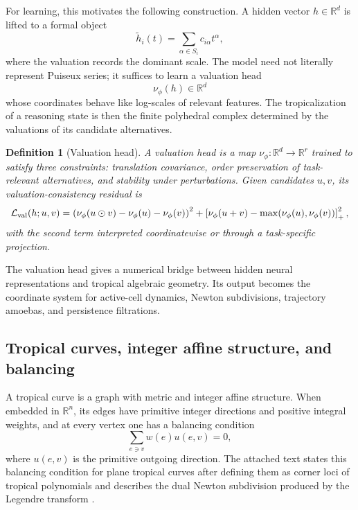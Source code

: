 \documentclass[11pt]{article}
\newtheorem{definition}{Definition}[section]
\newcommand{\R}{\mathbb{R}}
\newcommand{\calL}{\mathcal{L}}
\begin{document}
For learning, this motivates the following construction.  A hidden vector \(h\in\R^d\) is lifted to a formal object
\begin{equation}
\tilde h_i(t)=\sum_{\alpha\in S_i} c_{i\alpha}t^\alpha,
\end{equation}
where the valuation records the dominant scale.  The model need not literally represent Puiseux series; it suffices to learn a valuation head
\begin{equation}
\nu_\phi(h)\in\R^d
\end{equation}
whose coordinates behave like log-scales of relevant features.  The tropicalization of a reasoning state is then the finite polyhedral complex determined by the valuations of its candidate alternatives.

\begin{definition}[Valuation head]
A valuation head is a map \(\nu_\phi:\R^d\to\R^r\) trained to satisfy three constraints: translation covariance, order preservation of task-relevant alternatives, and stability under perturbations.  Given candidates \(u,v\), its valuation-consistency residual is
\begin{equation}
\calL_{\rm val}(h;u,v)=\left(\nu_\phi(u\odot v)-\nu_\phi(u)-\nu_\phi(v)\right)^2 + \left[\nu_\phi(u+v)-\max(\nu_\phi(u),\nu_\phi(v))\right]_+^2,
\end{equation}
with the second term interpreted coordinatewise or through a task-specific projection.
\end{definition}

The valuation head gives a numerical bridge between hidden neural representations and tropical algebraic geometry.  Its output becomes the coordinate system for active-cell dynamics, Newton subdivisions, trajectory amoebas, and persistence filtrations.

\subsection{Tropical curves, integer affine structure, and balancing}

A tropical curve is a graph with metric and integer affine structure.  When embedded in \(\R^n\), its edges have primitive integer directions and positive integral weights, and at every vertex one has a balancing condition
\begin{equation}
\sum_{e\ni v}w(e)u(e,v)=0,
\end{equation}
where \(u(e,v)\) is the primitive outgoing direction.  The attached text states this balancing condition for plane tropical curves after defining them as corner loci of tropical polynomials and describes the dual Newton subdivision produced by the Legendre transform \cite{itenberg2009}.
\end{document}
